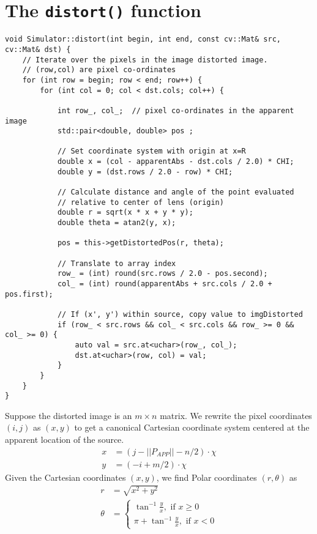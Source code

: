 \documentclass{scrartcl}
\begin{document}
\section{The \texttt{distort()} function}

\begin{lstlisting}
void Simulator::distort(int begin, int end, const cv::Mat& src, cv::Mat& dst) {
    // Iterate over the pixels in the image distorted image.
    // (row,col) are pixel co-ordinates
    for (int row = begin; row < end; row++) {
        for (int col = 0; col < dst.cols; col++) {

            int row_, col_;  // pixel co-ordinates in the apparent image
            std::pair<double, double> pos ;

            // Set coordinate system with origin at x=R
            double x = (col - apparentAbs - dst.cols / 2.0) * CHI;
            double y = (dst.rows / 2.0 - row) * CHI;

            // Calculate distance and angle of the point evaluated 
            // relative to center of lens (origin)
            double r = sqrt(x * x + y * y);
            double theta = atan2(y, x);

            pos = this->getDistortedPos(r, theta);

            // Translate to array index
            row_ = (int) round(src.rows / 2.0 - pos.second);
            col_ = (int) round(apparentAbs + src.cols / 2.0 + pos.first);

            // If (x', y') within source, copy value to imgDistorted
            if (row_ < src.rows && col_ < src.cols && row_ >= 0 && col_ >= 0) {
                auto val = src.at<uchar>(row_, col_);
                dst.at<uchar>(row, col) = val;
            }
        }
    }
}
\end{lstlisting}

Suppose the distorted image is an $m\times n$ matrix.
We rewrite the pixel coordinates $(i,j)$ as $(x,y)$ to get
a canonical Cartesian coordinate system centered at
the apparent location of the source.
\begin{align}
     x &= (j - ||P_{APP}|| - n/2)\cdot\chi \\
     y &= (-i + m/2)\cdot\chi 
\end{align}
Given the Cartesian coordinates $(x,y)$, we find Polar coordinates
$(r,\theta)$ as
\begin{align}
   r &= \sqrt{x^2+y^2}\\
   \theta &= 
     \begin{cases}
        \tan^{-1} \frac{y}{x}, \text{ if } x\ge0\\
        \pi + \tan^{-1} \frac{y}{x}, \text{ if } x<0
     \end{cases}
\end{align}
\end{document}
